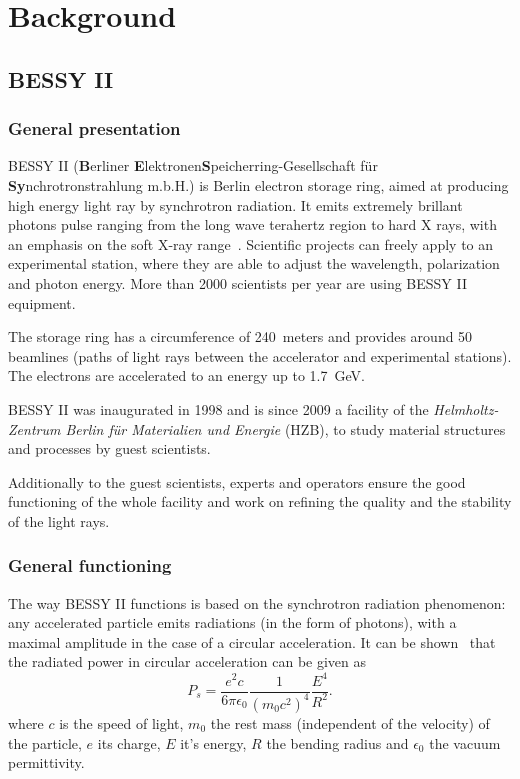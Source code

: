 \chapter{Background}
\label{sec:background}

\section{BESSY II}

\subsection{General presentation}
BESSY II (\textbf{B}erliner \textbf{E}lektronen\-\textbf{S}peicherring-Gesellschaft für \textbf{Sy}n\-chro\-tron\-strahlung m.b.H.) is Berlin electron storage ring, aimed at producing high energy light ray by synchrotron radiation. It emits extremely brillant photons pulse ranging from the long wave terahertz region to hard X rays, with an emphasis on the soft X-ray range~\cite{web:bessy_homepage}. Scientific projects can freely apply to an experimental station, where they are able to adjust the wavelength, polarization and photon energy. More than 2000 scientists per year are using BESSY II equipment.

The storage ring has a circumference of 240~meters and provides around 50 beamlines (paths of light rays between the accelerator and experimental stations). The electrons are accelerated to an energy up to 1.7~GeV.

BESSY II was inaugurated in 1998 and is since 2009 a facility of the \textit{Helmholtz-Zentrum Berlin für Materialien und Energie} (HZB), to study material structures and processes by guest scientists.

Additionally to the guest scientists, experts and operators ensure the good functioning of the whole facility and work on refining the quality and the stability of the light rays. 

\subsection{General functioning}
The way BESSY II functions is based on the synchrotron radiation phenomenon: any accelerated particle emits radiations (in the form of photons), with a maximal amplitude in the case of a circular acceleration.  It can be shown~\cite{book:wille} that the radiated power in circular acceleration can be given as 
\begin{equation}
P_s = \frac{e^2 c}{6 \pi \epsilon_0}\frac{1}{(m_0 c^2)^4}\frac{E^4}{R^2}.
\end{equation}
where $c$ is the speed of light, $m_0$ the rest mass (independent of the velocity) of the particle, $e$ its charge, $E$ it's energy, $R$ the bending radius and $\epsilon_0$ the  vacuum permittivity.

